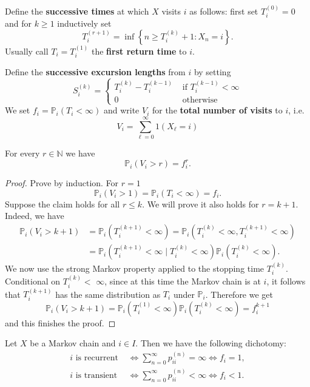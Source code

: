 \documentclass[a4paper,11pt]{article}
\begin{document}
\begin{definition}
    Define the \textbf{successive times} at which $X$ visits $i$ as follows: first set $T_i^{(0)}=0$
    and for $k \geq 1$ inductively set
    \[
    T_i^{(r+1)}=\inf \left\{n \geq T_i^{(k)}+1: X_n=i\right\} .
    \]
    Usually call $T_i=T_i^{(1)}$ the \textbf{first return time} to $i$. 
    
    Define the \textbf{successive excursion lengths} from $i$ by setting
    \[
    S_i^{(k)}=\begin{cases}
        T_i^{(k)}-T_i^{(k-1)} & \text { if } T_i^{(k-1)}<\infty \\
        0 & \text { otherwise }
    \end{cases} 
    \]
    We set $f_i=\mathbb{P}_i\left(T_i<\infty\right)$ and write $V_i$ for the \textbf{total number of visits} to $i$, i.e.
    \[
    V_i=\sum_{\ell=0}^{\infty} 1\left(X_{\ell}=i\right)
    \]
\end{definition}

\begin{lemma}
    For every $r \in \mathbb{N}$ we have
    \[
    \mathbb{P}_i\left(V_i>r\right)=f_i^r .
    \]
\end{lemma}

\begin{proof}
    Prove by induction. For $r=1$
    \[
    \mathbb{P}_i\left(V_i>1\right)=\mathbb{P}_i\left(T_i<\infty\right)=f_i .
    \]
    Suppose the claim holds for all $r \leq k$. We will prove it also holds for $r=k+1$. Indeed, we have
    \[
    \begin{aligned}
    \mathbb{P}_i\left(V_i>k+1\right) &=\mathbb{P}_i\left(T_i^{(k+1)}<\infty\right)=\mathbb{P}_i\left(T_i^{(k)}<\infty, T_i^{(k+1)}<\infty\right) \\
    &=\mathbb{P}_i\left(T_i^{(k+1)}<\infty \mid T_i^{(k)}<\infty\right) \mathbb{P}_i\left(T_i^{(k)}<\infty\right) .
    \end{aligned}
    \]
    We now use the strong Markov property applied to the stopping time $T_i^{(k)}$. Conditional on $T_i^{(k)}<$ $\infty$, since at this time the Markov chain is at $i$, it follows that $T_i^{(k+1)}$ has the same distribution as $T_i$ under $\mathbb{P}_i$. Therefore we get
    \[
    \mathbb{P}_i\left(V_i>k+1\right)=\mathbb{P}_i\left(T_i^{(1)}<\infty\right) \mathbb{P}_i\left(T_i^{(k)}<\infty\right)=f_i^{k+1}
    \]
    and this finishes the proof.
\end{proof}

\begin{theorem}
    Let $X$ be a Markov chain and $i \in I$. Then we have the following dichotomy:
\[
    \begin{aligned}
        i \text { is recurrent } & \Longleftrightarrow \sum_{n=0}^{\infty} p_{i i}^{(n)}=\infty \Longleftrightarrow f_i=1, \\
        i \text { is transient } & \Longleftrightarrow \sum_{n=0}^{\infty} p_{i i}^{(n)}<\infty \Longleftrightarrow f_i<1 .
    \end{aligned}
\]
\end{theorem}
\end{document}
